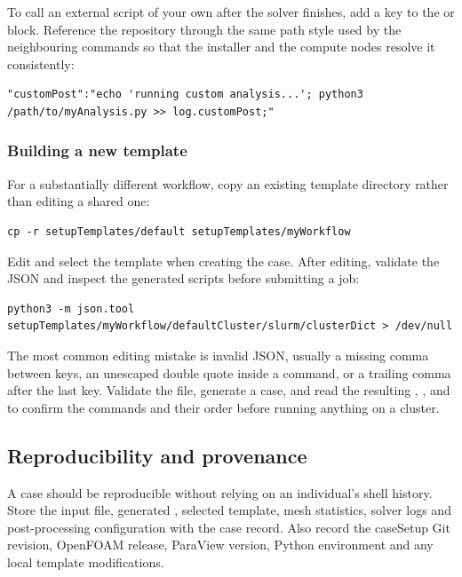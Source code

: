 To call an external script of your own after the solver finishes, add a key to the  or  block. Reference the repository through the same path style used by the neighbouring commands so that the installer and the compute nodes resolve it consistently:
\begin{lstlisting}
"customPost":"echo 'running custom analysis...'; python3 /path/to/myAnalysis.py >> log.customPost;"
\end{lstlisting}

\subsubsection{Building a new template}

For a substantially different workflow, copy an existing template directory rather than editing a shared one:
\begin{lstlisting}
cp -r setupTemplates/default setupTemplates/myWorkflow
\end{lstlisting}

Edit  and select the template when creating the case. After editing, validate the JSON and inspect the generated scripts before submitting a job:
\begin{lstlisting}
python3 -m json.tool setupTemplates/myWorkflow/defaultCluster/slurm/clusterDict > /dev/null
\end{lstlisting}

The most common editing mistake is invalid JSON, usually a missing comma between keys, an unescaped double quote inside a command, or a trailing comma after the last key. Validate the file, generate a case, and read the resulting , ,  and  to confirm the commands and their order before running anything on a cluster.

\subsection{Reproducibility and provenance}

A case should be reproducible without relying on an individual's shell history. Store the input file, generated , selected template, mesh statistics, solver logs and post-processing configuration with the case record. Also record the caseSetup Git revision, OpenFOAM release, ParaView version, Python environment and any local template modifications.

